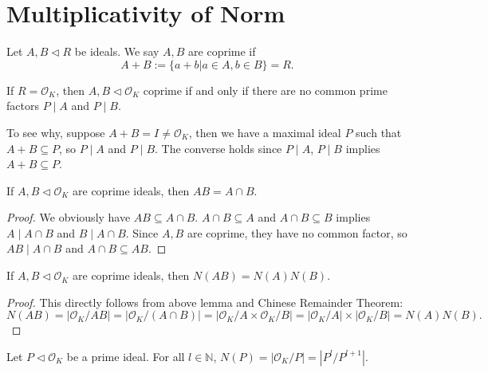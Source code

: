 \section{Multiplicativity of Norm}
\begin{definition}
    Let $A, B\lhd R$ be ideals. We say $A,B$ are coprime if 
    \[
    A+B:=\{a+b|a\in A, b\in B\}=R. 
    \]
\end{definition}

\begin{remark}
    If $R=\mathcal{O}_{K}$, then $A,B\lhd \mathcal{O}_{K}$ coprime if and only if there are no common prime factors $P\mid A$ and $P\mid B$. 

    To see why, suppose $A+B=I\neq \mathcal{O}_{K}$, then we have a maximal ideal $P$ such that $A+B\subseteq P$, so $P\mid A$ and $P\mid B$. The converse holds since $P\mid A$, $P\mid B$ implies $A+B\subseteq P$. 
\end{remark}

\begin{lemma}
    If $A,B\lhd \mathcal{O}_{K}$ are coprime ideals, then $AB=A\cap B$. 
\end{lemma}

\begin{proof}
    We obviously have $AB\subseteq A\cap B$. $A\cap B\subseteq A$ and $A\cap B\subseteq B$ implies $A\mid A\cap B$ and $B\mid A\cap B$. Since $A,B$ are coprime, they have no common factor, so $AB\mid A\cap B$ and $A\cap B\subseteq AB$. 
\end{proof}

\begin{theorem}
    If $A,B\lhd \mathcal{O}_{K}$ are coprime ideals, then $N(AB)=N(A)N(B)$. 
\end{theorem}

\begin{proof}
    This directly follows from above lemma and Chinese Remainder Theorem: 
    \[
    N(AB)=\left| \mathcal{O}_{K}/AB \right| =\left| \mathcal{O}_{K}/(A\cap B) \right| =\left| \mathcal{O}_{K}/A\times \mathcal{O}_{K}/B \right| =\left| \mathcal{O}_{K}/A \right| \times \left| \mathcal{O}_{K}/B \right| =N(A)N(B).
    \]
\end{proof}

\begin{lemma}
    Let $P\lhd \mathcal{O}_{K}$ be a prime ideal. For all $l\in \mathbb{N}$, $N(P)=\left| \mathcal{O}_{K} /P \right| =\left| P^{l}/P^{l+1} \right| $. 
\end{lemma}

